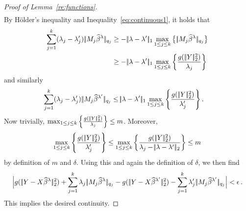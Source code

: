 \documentclass[bj]{imsart}
\newcommand{\normone}[1]{\ensuremath{\!|\!| #1 | \! |_{1}}}
\newcommand{\normtwo}[1]{\ensuremath{\!|\!| #1 | \! |_{2}}}
\newcommand{\normqj}[1]{\ensuremath{\!|\!| #1 | \! |_{q_j}}}
\newcommand{\1}{{\rm 1}\mskip -4,5mu{\rm l} }
\begin{document}
\begin{proof}[Proof of Lemma~\ref{re:functions}]
\begin{align*}
\end{align*}
By H\"older's inequality and Inequality~\eqref{eq:continuous1}, it holds that
\begin{align*}
\sum_{j=1}^{\numbergroups}(\lambda_j-\lambda'_j)\,\normqj{\fusedmatrix_j\estimatort}&\ge - \,\normone{\lambda-\lambda'}\max_{1\le j\le \numbergroups}\big\{\,\normqj{\fusedmatrix_j\estimatort}\big\} \\
&\ge -\,\normone{\lambda-\lambda'}\max_{1\le j\le \numbergroups}\left\{\frac{g(\,\normtwo{\outcome}^2)}{\lambda_j}\right\}
\end{align*}
and similarly
\begin{align*}
\sum_{j=1}^{\numbergroups}(\lambda_j-\lambda'_j)\,\normqj{\fusedmatrix_j\estimatortprime}&\le \normone{\lambda-\lambda'}\max_{1\le j\le \numbergroups}\left\{\frac{g(\,\normtwo{\outcome}^2)}{\lambda'_j}\right\}.
\end{align*}
Now trivially, $\max_{1\le j\le \numbergroups}\left\{\frac{g(\,\normtwo{\outcome}^2)}{\lambda_j}\right\}\leq m$. Moreover,
\begin{align*}
\max_{1\le j\le \numbergroups}\left\{\frac{g(\,\normtwo{\outcome}^2)}{\lambda'_j}\right\}\leq \max_{1\le j\le \numbergroups}\left\{\frac{g(\,\normtwo{\outcome}^2)}{\lambda_j-\normtwo{\lambda-\lambda'}}\right\}\leq m
\end{align*}
by definition of $m$ and $\delta.$ Using this and again the definition of $\delta$, we then find
\begin{align*}
\Big | g(\,\normtwo{\outcome-\design\estimatort}^2)+\sum_{j=1}^{\numbergroups}\lambda_j\,\normqj{\fusedmatrix_j\estimatort}-g(\,\normtwo{\outcome-\design\estimatortprime}^2)-\sum_{j=1}^{\numbergroups}\lambda'_j\,\normqj{\fusedmatrix_j\estimatortprime} \Big|<\epsilon\,.
\end{align*}
This implies the desired continuity.%


\end{proof}
\end{document}
